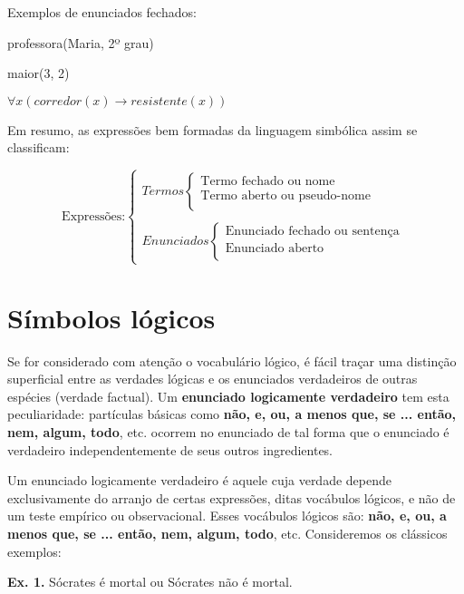 \documentclass[
	14pt,				%
	twoside,			%
	a4paper,			%
	english,			%
	french,				%
	spanish,			%
	brazil,				%
    ]{abntex2}
\begin{document}
\noindent
Exemplos de enunciados fechados:

\hskip 2.5cm professora(Maria, 2º grau)

\hskip 2.5cm maior(3, 2)

\hskip 2.5cm $\forall x(corredor(x) \rightarrow resistente(x))$

Em resumo, as expressões bem formadas da linguagem simbólica assim se classificam:

\[
    \text{Expressões:}
    \begin{cases}
        Termos
        \begin{cases}
            \text{Termo fechado ou nome}\\
            \text{Termo aberto ou pseudo-nome}\\
        \end{cases}

        \\
        \\

        Enunciados
        \begin{cases}
            \text{Enunciado fechado ou sentença}\\
            \text{Enunciado aberto}\\
        \end{cases}
    \end{cases}
\]


\newpage

\section{Símbolos lógicos}

Se for considerado com atenção o vocabulário lógico, é fácil traçar uma distinção superficial entre as verdades lógicas e os enunciados verdadeiros de outras espécies (verdade factual).
Um \textbf{enunciado logicamente verdadeiro} tem esta peculiaridade: partículas básicas como \textbf{não, e, ou, a menos que, se ... então, nem, algum, todo}, etc. ocorrem no enunciado de tal forma que o enunciado é verdadeiro independentemente de seus outros ingredientes.

Um enunciado logicamente verdadeiro é aquele cuja verdade depende exclusivamente do arranjo de certas expressões, ditas vocábulos lógicos, e não de um teste empírico ou observacional.
Esses vocábulos lógicos são: \textbf{não, e, ou, a menos que, se ... então, nem, algum, todo}, etc.
Consideremos os clássicos exemplos:

\bigskip
\noindent
\textbf{Ex. 1.} Sócrates é mortal ou Sócrates não é mortal.
\end{document}

